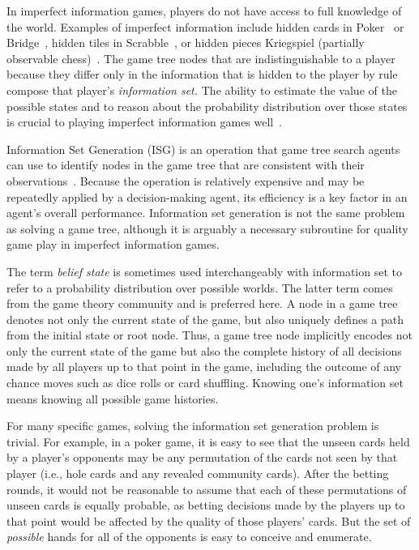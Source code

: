 \documentclass[times, 10pt,twocolumn]{article}
\begin{document}
In imperfect information games, players do not have access to full knowledge of
the world. Examples of imperfect information include hidden cards in
Poker~\cite{billings02challenge} or Bridge~\cite{ginsberg96partition}, hidden
tiles in Scrabble~\cite{richards07opponent}, or hidden pieces 
Kriegspiel (partially observable chess)~\cite{li94chess}. The game tree nodes
that are indistinguishable to a player because they differ only in the
information that is hidden to the player by rule compose that player's {\em
information set.}  The ability to estimate the value of the possible states and
to reason about the probability distribution over those states is crucial to
playing imperfect information games well~\cite{thielscher12hyperplay}. 

Information Set Generation (ISG) is an operation that game tree search agents
can use to identify nodes in the game tree that are consistent with their
observations~\cite{richards12reasoning}.  Because the operation is relatively
expensive and may be repeatedly applied by a decision-making agent, its
efficiency is a key factor in an agent's overall performance. Information set generation is not the same problem as solving a game tree, although it is arguably a necessary subroutine for quality game play in imperfect information games. 

The term {\em belief state} is sometimes used interchangeably with information set to refer to a probability
distribution over possible worlds.  The latter term comes from the game theory community and is preferred here.  A node
in a game tree denotes not only the current state of the game, but also uniquely defines a path from the initial state
or root node.  Thus, a game tree node implicitly encodes not only the current state of the game but also the complete
history of all decisions made by all players up to that point in the game, including the outcome of any chance moves
such as dice rolls or card shuffling.  Knowing one's information set means knowing all possible game histories.

For many specific games, solving the information set generation problem is trivial.  For example, in a poker game, it is easy to
see that the unseen cards held by a player's opponents may be any permutation of the cards not seen by that player
(i.e., hole cards and any revealed community cards).  After the betting rounds, it would not be reasonable to assume
that each of these permutations of unseen cards is equally probable, as betting decisions made by the players up to that
point would be affected by the quality of those players' cards.  But the set of {\em possible} hands for all of the
opponents is easy to conceive and enumerate.
\end{document}
